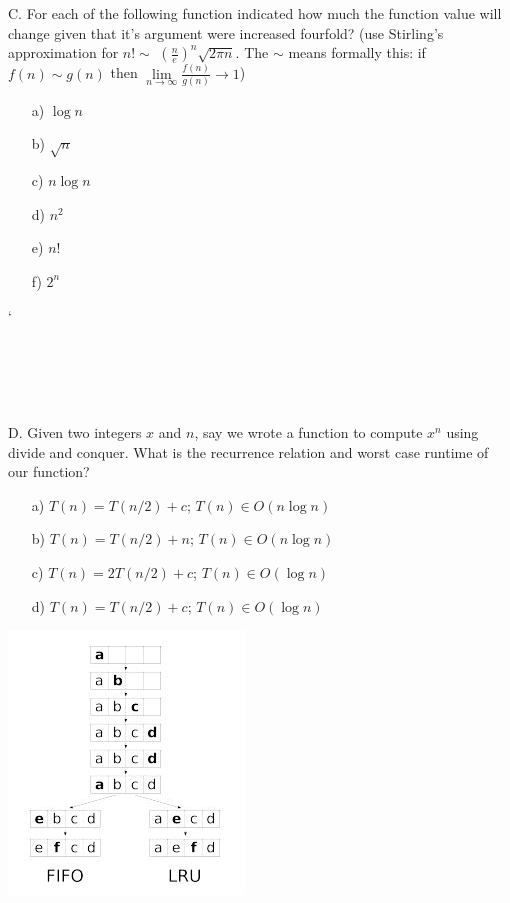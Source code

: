 \documentclass[12pt]{article}
\begin{document}
\newpage
\noindent C. For each of the following function indicated how much the function value will change given that it's argument were increased fourfold? (use Stirling's approximation for $n! \sim$ $(\frac{n}{e})^n\sqrt{2\pi n}$. The $\sim$ means formally this: if $f(n) \sim g(n)$ then $\lim\limits_{n\to\infty}{\frac{f(n)}{g(n)}\to1}$)
\begin{enumerate}
    \item[a)]$\log{n}$
    \item[b)]$\sqrt{n}$
    \item[c)]$n\log{n}$
    \item[d)]$n^2$
    \item[e)]$n!$
    \item[f)]$2^n$
\end{enumerate}
`\\\\\\\\\\\\D. Given two integers $x$ and $n$, say we wrote a function to compute $x^n$ using divide and conquer. What is the recurrence relation and worst case runtime of our function?
\begin{enumerate}
    \item[a)]$T(n) = T(n/2) + c$; $T(n) \in O(n\log{n})$
    \item[b)]$T(n) = T(n/2) + n$; $T(n) \in O(n\log{n})$
    \item[c)] $T(n) = 2T(n/2) + c$; $T(n) \in O(\log{n})$
    \item[d)]$T(n) = T(n/2) + c$; $T(n) \in O(\log{n})$
\end{enumerate}
\newpage
\noindent \includegraphics{fifolru.jpg}\\
\end{document}
